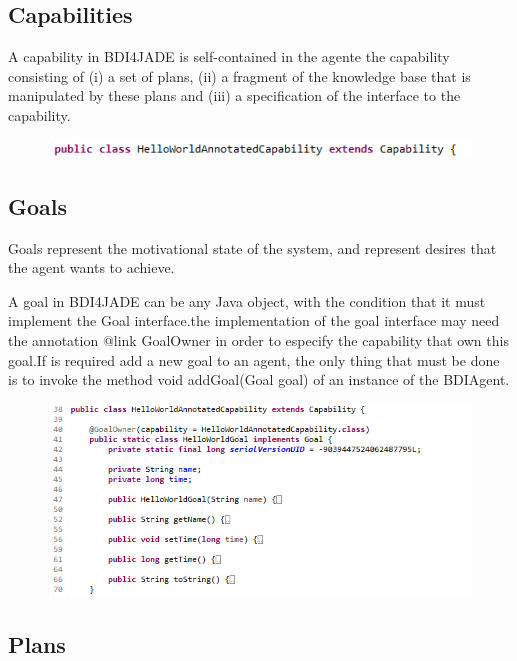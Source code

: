 \documentclass{article}
\begin{document}
\subsection{Capabilities} \label{sec:capability}

A capability in BDI4JADE is self-contained in the agente the capability consisting of (i) a set of plans, (ii) a fragment of the knowledge base that is manipulated by these plans and (iii) a specification of the interface to the capability.

\begin{figure}[!h]
	\centering
	\includegraphics[width=\linewidth]{capability}
	\label{fig:capability}
\end{figure}

\subsection{Goals} \label{sec:goal}

Goals represent the motivational state of the system, and represent desires that the agent wants to achieve.

A goal in BDI4JADE can be any Java object, with the condition that it must implement the Goal interface.the implementation of the goal interface may need the annotation {@link GoalOwner} in order to especify the capability that own this goal.If is required add a new goal to an agent, the only thing that must be done is to invoke the method void addGoal(Goal goal) of an instance of the BDIAgent.

\begin{figure}[!h]
	\centering
	\includegraphics[width=\linewidth]{Goal}
	\label{fig:goal}
\end{figure}

\subsection{Plans} \label{sec:plans}
\end{document}
